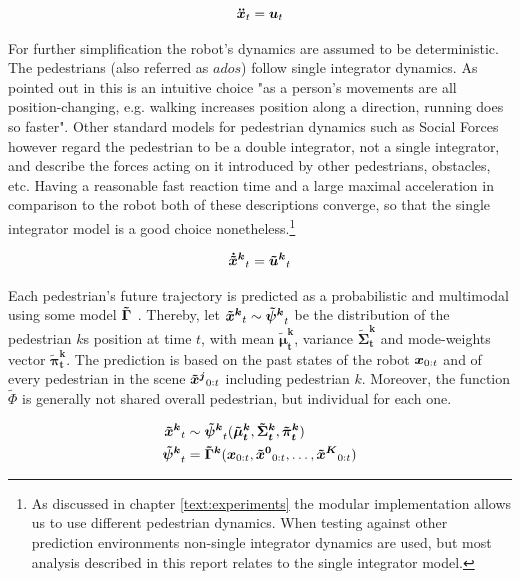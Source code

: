\begin{equation}
\boldsymbol{\ddot{x}}_t = \boldsymbol{u}_t
\label{eq:robot_dynamics}
\end{equation}

For further simplification the robot's dynamics are assumed to be deterministic. 
The pedestrians (also referred as $ados$) follow single integrator dynamics. As pointed out in \cite{Ivanovic18} this is an intuitive choice "as a person’s movements are all position-changing, e.g. walking increases position along a direction, running does so faster". Other standard models for pedestrian dynamics such as Social Forces \cite{Helbling1995} however regard the pedestrian to be a double integrator, not a single integrator, and describe the forces acting on it introduced by other pedestrians, obstacles, etc. Having a reasonable fast reaction time and a large maximal acceleration in comparison to the robot both of these descriptions converge, so that the single integrator model is a good choice nonetheless.\footnote{As discussed in chapter \ref{text:experiments} the modular implementation allows us to use different pedestrian dynamics. When testing against other prediction environments non-single integrator dynamics are used, but most analysis described in this report relates to the single integrator model.} 

\begin{align}
\dxped[k]_t = \uped[k]_t
\label{eq:pedestrian_dynamics}
\end{align}

Each pedestrian's future trajectory is predicted as a probabilistic and multimodal using some model $\distmodel[]$ . Thereby,  let $\xped[k]_t \sim \dist[k]_t$ be the distribution of the pedestrian $k$s position at time $t$, with mean $\boldsymbol{\tilde{\mu}_t^k}$, variance $\boldsymbol{\tilde{\Sigma}_t^k}$ and mode-weights vector $\boldsymbol{\tilde{\pi}_t^k}$. The prediction is based on the past states of the robot $\boldsymbol{x}_{0:t}$ and of every pedestrian in the scene $\xped[j]_{0:t}$ including pedestrian $k$. Moreover, the function $\tilde{\Phi}$ is generally not shared overall pedestrian, but individual for each one.

\begin{align}
\xped[k]_t &\sim \dist[k]_t(\boldsymbol{\tilde{\mu}_t^k}, \boldsymbol{\tilde{\Sigma}_t^k}, \boldsymbol{\tilde{\pi}_t^k}) \\
\dist[k]_t &= \distmodel[k] (\x_{0:t}, \xped[0]_{0:t}, \hdots, \xped[K]_{0:t})
\end{align}

